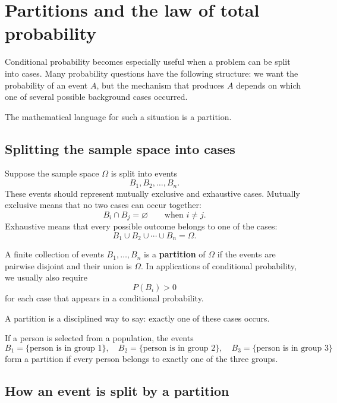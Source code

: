 \section{Partitions and the law of total probability}

Conditional probability becomes especially useful when a problem can be split
into cases. Many probability questions have the following structure: we want the
probability of an event \(A\), but the mechanism that produces \(A\) depends on
which one of several possible background cases occurred.

The mathematical language for such a situation is a partition.

\subsection*{Splitting the sample space into cases}

Suppose the sample space \(\Omega\) is split into events
\[
B_1,B_2,\ldots,B_n.
\]
These events should represent mutually exclusive and exhaustive cases. Mutually
exclusive means that no two cases can occur together:
\[
B_i\cap B_j=\varnothing\qquad\text{when }i\neq j.
\]
Exhaustive means that every possible outcome belongs to one of the cases:
\[
B_1\cup B_2\cup\cdots\cup B_n=\Omega.
\]

\begin{definitionbox}
A finite collection of events \(B_1,
\ldots,B_n\) is a \textbf{partition} of
\(\Omega\) if the events are pairwise disjoint and their union is \(\Omega\). In
applications of conditional probability, we usually also require
\[
P(B_i)>0
\]
for each case that appears in a conditional probability.
\end{definitionbox}

A partition is a disciplined way to say: exactly one of these cases occurs.

\begin{examplebox}
If a person is selected from a population, the events
\[
B_1=\{\text{person is in group 1}\},\quad
B_2=\{\text{person is in group 2}\},\quad
B_3=\{\text{person is in group 3}\}
\]
form a partition if every person belongs to exactly one of the three groups.
\end{examplebox}

\subsection*{How an event is split by a partition}

